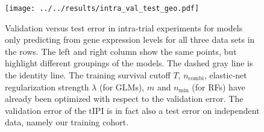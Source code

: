 \begin{figure}
    \centering
    \texttt{[image: ../../results/intra\_val\_test\_geo.pdf]}
    \caption{Validation versus test error in intra-trial experiments for models only predicting 
        from gene expression levels for all 
        three data sets in the rows. The left and right column show the same points, but highlight 
        different groupings of the models. The dashed gray line is the 
        identity line. The training survival cutoff $T$, 
        $n_\text{combi}$, elastic-net regularization strength $\lambda$ (for GLMs), 
        $m$ and $n_\text{min}$ (for RFs) have already been optimized with respect to the 
        validation error. The 
        validation error of the $\text{tIPI}$ is in fact also a test error on independent data, 
        namely our training cohort.}
    \label{fig:intra-val-test-geo}
\end{figure}